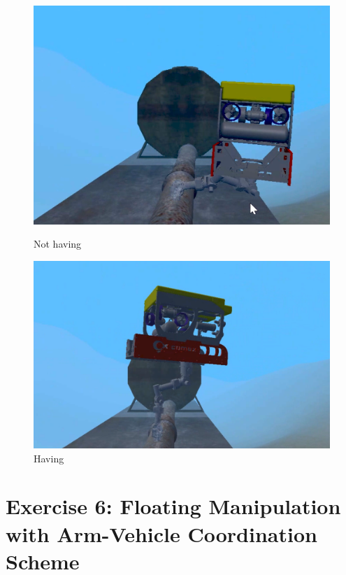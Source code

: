 \documentclass{article}
\begin{document}
\begin{figure}[htp]
    \centering
    \begin{minipage}{0.50\textwidth}
    \includegraphics[scale=0.37]{513_comment.png}
    \caption{Not having}
    \end{minipage}
\hfill
    \centering
    \begin{minipage}{0.50\textwidth}
    \includegraphics[scale=0.3]{513_uncomment.png}
    \caption{Having}
    \end{minipage}
\end{figure}


\clearpage
\section{Exercise 6: Floating Manipulation with Arm-Vehicle Coordination Scheme}
\end{document}

